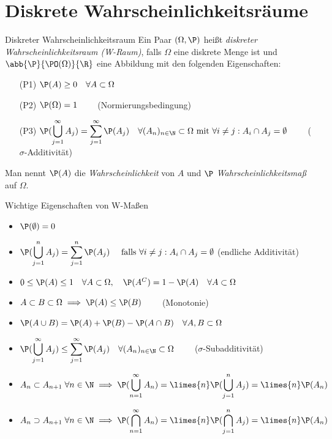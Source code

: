 \section*{Diskrete Wahrscheinlichkeitsräume}

\begin{karte}{Diskreter Wahrscheinlichkeitsraum}
	Ein Paar $(\Omega, \P)$ heißt \textit{diskreter Wahrscheinlichkeitsraum (W-Raum)}, falls $\Omega$ eine diskrete Menge ist und $\abb{\P}{\PO(\Omega)}{\R}$ eine Abbildung mit den folgenden Eigenschaften:
	\begin{itemize}
		\item[(P1)] $\P(A) \geq 0 \quad \forall A \subset \Omega$
		\item[(P2)] $\P(\Omega) = 1 \qquad$ (Normierungsbedingung)
		\item[(P3)] $\displaystyle \P(\bigcup_{j=1}^{\infty} A_j) = \sum_{j=1}^{\infty} \P(A_j) \quad \forall (A_n)_{n \in \N} \subset \Omega \text{ mit } \forall i\neq j: A_i \cap A_j = \emptyset \qquad$ ($\sigma$-Additivität)
	\end{itemize}
	Man nennt $\P(A)$ die \textit{Wahrscheinlichkeit} von $A$ und $\P$ \textit{Wahrscheinlichkeitsmaß} auf $\Omega$.
\end{karte}

\begin{karte}{Wichtige Eigenschaften von W-Maßen}
	\begin{itemize}
		\item $\P(\emptyset)=0$
		\item $\displaystyle \P(\bigcup_{j=1}^{n} A_j) = \sum_{j=1}^{n} \P(A_j) \quad \text{ falls } \forall i\neq j: A_i \cap A_j = \emptyset$ (endliche Additivität)
		\item $0 \leq \P(A) \leq 1 \quad \forall A \subset \Omega, \quad \P(A^C) = 1-\P(A) \quad \forall A \subset \Omega$
		\item $A \subset B \subset \Omega \implies \P(A) \leq \P(B) \qquad$ (Monotonie)
		\item $\P(A \cup B) = \P(A)+\P(B)-\P(A \cap B) \quad \forall A,B \subset \Omega$
		\item $\displaystyle \P(\bigcup_{j=1}^{\infty} A_j) \leq \sum_{j=1}^{\infty} \P(A_j) \quad \forall (A_n)_{n \in \N} \subset \Omega \qquad$ ($\sigma$-Subadditivität)
		\item $\displaystyle A_n \subset A_{n+1} \; \forall n \in \N \implies \P(\bigcup_{n=1}^{\infty} A_n) = \limes{n} \P(\bigcup_{j=1}^{n} A_j) = \limes{n} \P(A_n)$
		\item $\displaystyle A_n \supset A_{n+1} \; \forall n \in \N \implies \P(\bigcap_{n=1}^{\infty} A_n) = \limes{n} \P(\bigcap_{j=1}^{n} A_j) = \limes{n} \P(A_n)$
	\end{itemize}
\end{karte}

